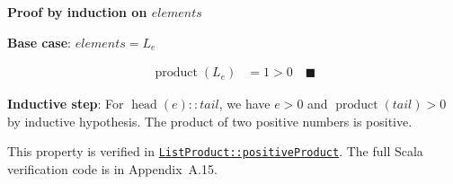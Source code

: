 \textbf{Proof by induction on $elements$}\par\nopagebreak

\textbf{Base case}: $elements = L_e$\par\nopagebreak

\begin{equation*}
\begin{aligned}
\operatorname{product}(L_e) &= 1 > 0 \quad \blacksquare
\end{aligned}
\end{equation*}

\textbf{Inductive step}: For $\operatorname{head}(e) :: tail$, we have
$e > 0$ and $\operatorname{product}(tail) > 0$ by inductive hypothesis.
The product of two positive numbers is positive.

{\raggedright
This property is verified in
\href{https://github.com/thiagomata/prime-numbers/blob/list-article-v1.0.0/src/main/scala/v1/chapter3/list/properties/ListProduct.scala}{\texttt{ListProduct::\allowbreak positiveProduct}}.
The full Scala verification code is in Appendix~A.15.
\par}
